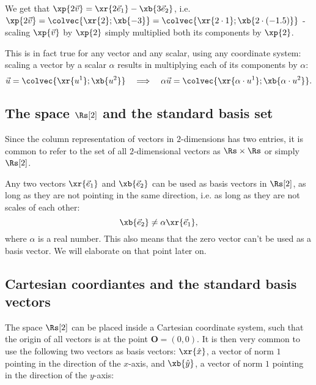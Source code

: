 We get that $\xp{2\vec{v}}=\xr{2\vec{e}_{1}}-\xb{3\vec{e}_{2}}$, i.e. $\xp{2\vec{v}}=\colvec{\xr{2};\xb{-3}}=\colvec{\xr{2\cdot1};\xb{2\cdot(-1.5)}}$ - scaling $\xp{\vec{v}}$ by $\xp{2}$ simply multiplied both its components by $\xp{2}$.

This is in fact true for any vector and any scalar, using any coordinate system: scaling a vector by a scalar $\alpha$ results in multiplying each of its components by $\alpha$:
\begin{equation}
  \vec{u} = \colvec{\xr{u^{1}};\xb{u^{2}}}\quad\Longrightarrow\quad \alpha\vec{u} = \colvec{\xr{\alpha\cdot u^{1}};\xb{\alpha\cdot u^{2}}}.
  \label{eq:label}
\end{equation}

\subsection{The space $\Rs[2]$ and the standard basis set}
Since the column representation of vectors in $2$-dimensions has two entries, it is common to refer to the set of all $2$-dimensional vectors as $\Rs\times\Rs$ or simply $\Rs[2]$.

Any two vectors $\xr{\vec{e}_{1}}$ and $\xb{\vec{e}_{2}}$ can be used as basis vectors in $\Rs[2]$, as long as they are not pointing in the same direction, i.e. as long as they are not scales of each other:
\begin{equation}
  \xb{\vec{e}_{2}} \neq \alpha\xr{\vec{e}_{1}},
  \label{eq:basis_vectors_not_scales}
\end{equation}
where $\alpha$ is a real number. This also means that the zero vector can't be used as a basis vector. We will elaborate on that point later on.

\subsection{Cartesian coordiantes and the standard basis vectors}

The space $\Rs[2]$ can be placed inside a Cartesian coordinate system, such that the origin of all vectors is at the point $\bm{O}=(0,0)$. It is then very common to use the following two vectors as basis vectors: $\xr{\hat{x}}$, a vector of norm $1$ pointing in the direction of the $x$-axis, and $\xb{\hat{y}}$, a vector of norm $1$ pointing in the direction of the $y$-axis:

